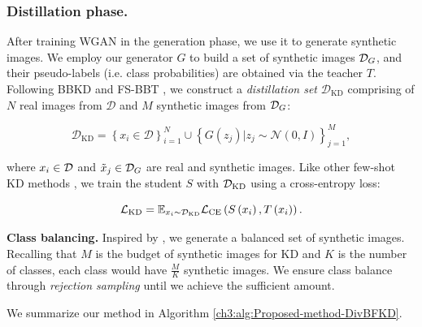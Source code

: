\subsubsection{Distillation phase.}
\begin{foldable}
    After training WGAN in the generation phase, we use it to generate synthetic images.
    We employ our generator $G$ to build a set of synthetic images ${\cal D}_{G}$, and their pseudo-labels (i.e. class probabilities) are obtained via the teacher $T$.
    Following BBKD \cite{wang2020neural} and FS-BBT \cite{nguyen2022black}, we construct a \textit{distillation set} $\mathcal{D}_{\text{KD}}$ comprising of $N$ real images from $\mathcal{D}$ and $M$ synthetic images from ${\cal D}_{G}$:
\end{foldable}
\begin{equation}
    \mathcal{D}_{\text{KD}}=\left\{x_{i}\in\mathcal{D}\right\} _{i=1}^{N}\cup\left\{G\left(z_{j}\right)|z_{j}\sim\mathcal{N}\left(0,I\right)\right\} _{j=1}^{M},
    \label{ch3:eq:Distillation-set}
\end{equation}
\begin{foldable}
    where $x_{i}\in{\cal D}$ and $\tilde{x}_{j}\in{\cal D}_{G}$ are real and synthetic images.
    Like other few-shot KD methods \cite{wang2020neural,nguyen2022black}, we train the student $S$ with ${\cal D}_{\text{KD}}$ using a cross-entropy loss:
\end{foldable}
\begin{equation}
    {\cal {\cal L}}_{\text{KD}}=\mathbb{E}_{x_{i}\sim{\cal D}_{\text{KD}}}{\cal L}_{\text{CE}}\left(S\left(x_{i}\right),T\left(x_{i}\right)\right).
    \label{ch3:eq:Loss-S}
\end{equation}

\begin{foldable}
    \textbf{Class balancing.} Inspired by \cite{chen2019data,zhang2022ideal}, we generate a balanced set of synthetic images.
    Recalling that $M$ is the budget of synthetic images for KD and $K$ is the number of classes, each class would have $\frac{M}{K}$ synthetic images.
    We ensure class balance through \textit{rejection sampling} until we achieve the sufficient amount.
\end{foldable}

\begin{foldable}
    We summarize our method in Algorithm \ref{ch3:alg:Proposed-method-DivBFKD}.
\end{foldable}
